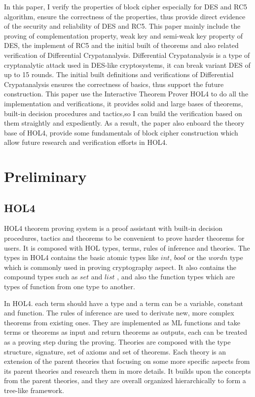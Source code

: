 \documentclass{article}
\begin{document}
In this paper, I verify the properties
of block cipher especially for DES and RC5 algorithm, ensure the correctness of the properties, thus provide
direct evidence of the security and reliability of DES and RC5. This paper mainly include the proving of
complementation property,
weak key and semi-weak key property of DES, the implement of RC5 and the initial built of theorems and also related verification
of Differential Crypatanalysis. Differential Crypatanalysis is a type of cryptanalytic attack used in DES-like
cryptosystems, it can break variant DES of up to 15 rounds. The initial built definitions and verifications of
Differential Crypatanalysis ensures the correctness of basics, thus support the future construction. This paper
use the Interactive Theorem Prover HOL4 to do all the implementation and verifications, it provides solid and
large bases of theorems, built-in decision procedures and tactics,so I can build the verification based on them
straightly and expediently. As a result, the paper also enboard the theory base of HOL4, provide some
fundamentals of block cipher construction which allow future research and verification efforts in HOL4.

\section{Preliminary}
\subsection{HOL4}
HOL4 theorem proving system is a proof assistant with built-in decision procedures, tactics and theorems to
be convenient to prove harder theorems for users. It is composed with HOL types, terms, rules of inference
and theories. The types in HOL4 contains the basic atomic types like $int$, $bool$ or the $word n$ type which
is commonly used in proving cryptography aspect. It also contains the compound types such as $set$ and $list$
, and also the function types which are types of function from one type to another.

In HOL4. each term should
have a type and a term can be a variable, constant and function. The rules of inference are used to derivate
new, more complex theorems from existing ones. They are implemented as ML functions and take terms or theorems
as input and return theorems as outputs, each can be treated as a proving step during the proving. Theories are
composed with the type structure, signature, set of axioms and set of theorems. Each theory is an extension of
the parent theories that focusing on some more specific aspects from its parent theories and research them in
more details. It builds upon the concepts from the parent theories, and they are overall organized hierarchically
to form a tree-like framework.
\end{document}
